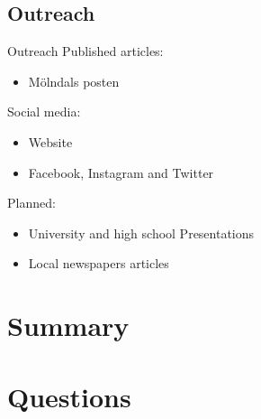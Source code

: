 \documentclass[11pt, aspectratio=169]{beamer}
\begin{document}
\subsection{Outreach}

    \begin{frame}[c]{Outreach }
       	Published articles:
       	\begin{itemize}
           	\item Mölndals posten
       	 \end{itemize}
		Social media:        
       	\begin{itemize}
          	\item Website
            \item Facebook, Instagram and Twitter
       	\end{itemize}
       	Planned:
       	\begin{itemize}
           	\item University and high school Presentations
           	\item Local newspapers articles
        \end{itemize}
    \end{frame}


\section{Summary}

\section{Questions}
\end{document}
